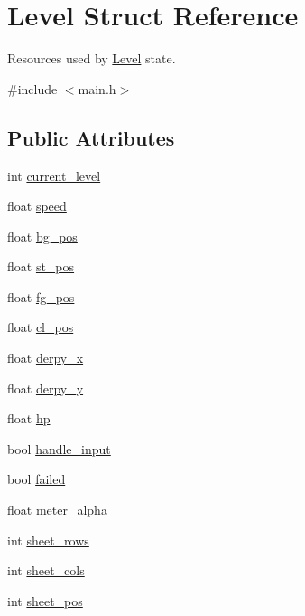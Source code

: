 \hypertarget{structLevel}{\section{\-Level \-Struct \-Reference}
\label{structLevel}
}


\-Resources used by \hyperlink{structLevel}{\-Level} state.  




{\ttfamily \#include $<$main.\-h$>$}

\subsection*{\-Public \-Attributes}
\begin{DoxyCompactItemize}
\item 
int \hyperlink{structLevel_a1ba3ee0104c912dde5d6e70fee889512}{current\-\_\-level}
\item 
float \hyperlink{structLevel_a936a1d131d1e056878474ca831c5e88f}{speed}
\item 
float \hyperlink{structLevel_a00321214fdc30f67615053d1ca614948}{bg\-\_\-pos}
\item 
float \hyperlink{structLevel_ab13f799d9e2e06a04debbd97676fb512}{st\-\_\-pos}
\item 
float \hyperlink{structLevel_a665bb93951ab6b7a91543712152a3acf}{fg\-\_\-pos}
\item 
float \hyperlink{structLevel_af466533be369b5ce1f48196a7f3b7b0b}{cl\-\_\-pos}
\item 
float \hyperlink{structLevel_ae5a97d5b61c70c63e93992a9ff3935f9}{derpy\-\_\-x}
\item 
float \hyperlink{structLevel_a7b3c0f5af134797a1ed21ef48da3ab00}{derpy\-\_\-y}
\item 
float \hyperlink{structLevel_a49df009e8113251cfcb48fe17df0b571}{hp}
\item 
bool \hyperlink{structLevel_a06cf4f2da517284d2006540051d3e5c0}{handle\-\_\-input}
\item 
bool \hyperlink{structLevel_a5bea34b31777260f1b23a1d64e6cd865}{failed}
\item 
float \hyperlink{structLevel_a246ce1ecf1523db218cf067df15e511f}{meter\-\_\-alpha}
\item 
int \hyperlink{structLevel_a6d608b79c9b4dd8a5efc0c7e5fb482b0}{sheet\-\_\-rows}
\item 
int \hyperlink{structLevel_a8a5c443169a4ff15f330a65473eedb1b}{sheet\-\_\-cols}
\item 
int \hyperlink{structLevel_a21c699af201ffe60ccd1319b3f540947}{sheet\-\_\-pos}

\end{DoxyCompactItemize}
